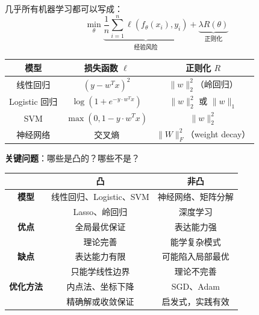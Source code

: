\documentclass[12pt, a4paper]{ctexart}
\begin{document}
\begin{blackboard}[机器学习 = 优化]

几乎所有机器学习都可以写成：
\[
\min_\theta \underbrace{\frac{1}{n} \sum_{i=1}^n \ell(f_\theta(x_i), y_i)}_{\text{经验风险}} + \underbrace{\lambda R(\theta)}_{\text{正则化}}
\]

\begin{center}
\begin{tabular}{c|c|c}
模型 & 损失函数 $\ell$ & 正则化 $R$ \\
\hline
线性回归 & $(y - w^Tx)^2$ & $\|w\|_2^2$（岭回归） \\
Logistic 回归 & $\log(1 + e^{-y \cdot w^Tx})$ & $\|w\|_2^2$ 或 $\|w\|_1$ \\
SVM & $\max(0, 1 - y \cdot w^Tx)$ & $\|w\|_2^2$ \\
神经网络 & 交叉熵 & $\|W\|_F^2$（weight decay）
\end{tabular}
\end{center}

\textbf{关键问题}：哪些是凸的？哪些不是？

\end{blackboard}

\begin{blackboard}[凸 vs 非凸机器学习]

\begin{center}
\begin{tabular}{c|c|c}
& \textbf{凸} & \textbf{非凸} \\
\hline
\textbf{模型} & 线性回归、Logistic、SVM & 神经网络、矩阵分解 \\
& Lasso、岭回归 & 深度学习 \\
\hline
\textbf{优点} & 全局最优保证 & 表达能力强 \\
& 理论完善 & 能学复杂模式 \\
\hline
\textbf{缺点} & 表达能力有限 & 可能陷入局部最优 \\
& 只能学线性边界 & 理论不完善 \\
\hline
\textbf{优化方法} & 内点法、坐标下降 & SGD、Adam \\
& 精确解或收敛保证 & 启发式，实践有效
\end{tabular}
\end{center}

\end{blackboard}
\end{document}

